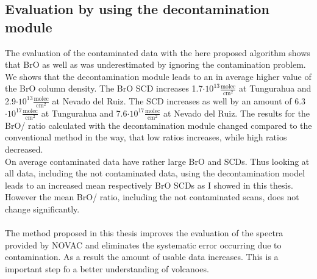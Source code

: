 \documentclass  [
  paper    = a4,
  BCOR     = 10mm,
  twoside,
  fontsize = 12pt,
  fleqn,
  toc      = bibnumbered,
  toc      = listofnumbered,
  numbers  = noendperiod,
  headings = normal,
  listof   = leveldown,
  version  = 3.03
]                                       {scrreprt}
\begin{document}
	\subsection*{Evaluation by using the decontamination module} 
	The evaluation of the contaminated data with the here proposed algorithm shows that BrO as well as  was underestimated by ignoring the contamination problem.
	We shows that the decontamination module leads to an in average higher value of the BrO column density. The BrO SCD increases 1.7$\cdot 10^{13}\frac{\text{molec}}{\text{cm}^2}$ at Tungurahua and 2.9$\cdot 10^{13}\frac{\text{molec}}{\text{cm}^2}$ at Nevado del Ruiz. The  SCD increases as well by an amount of 6.3$\cdot 10^{17}\frac{\text{molec}}{\text{cm}^2}$ at Tungurahua and 7.6$\cdot 10^{17}\frac{\text{molec}}{\text{cm}^2}$ at Nevado del Ruiz. The results for the BrO/ ratio calculated with the decontamination module changed compared to the conventional method in the way, that low ratios increases, while high ratios decreased.\\
	On average contaminated data have rather large BrO and  SCDs. Thus looking at all data, including the not contaminated data, using the decontamination model leads to an increased mean  respectively BrO SCDs as I showed in this thesis.
	However the mean BrO/ ratio, including the not contaminated scans, does not change significantly.\\
	\\
	The method proposed in this thesis improves the evaluation of the spectra provided by NOVAC and eliminates the systematic error occurring due to contamination. As a result the amount of usable data increases. This is a important step fo a better understanding of volcanoes.
	

	
\end{document}
